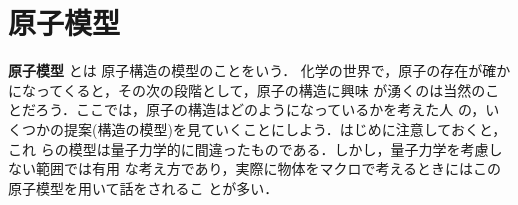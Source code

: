     \section{原子模型}
            \begin{mycomment}
                \textbf{原子模型} とは 原子構造の模型のことをいう．
                化学の世界で，原子の存在が確かになってくると，その次の段階として，原子の構造に興味
                が湧くのは当然のことだろう．ここでは，原子の構造はどのようになっているかを考えた人
                の，いくつかの提案(構造の模型)を見ていくことにしよう．はじめに注意しておくと，これ
                らの模型は量子力学的に間違ったものである．しかし，量子力学を考慮しない範囲では有用
                な考え方であり，実際に物体をマクロで考えるときにはこの原子模型を用いて話をされるこ
                とが多い．
            \end{mycomment}

